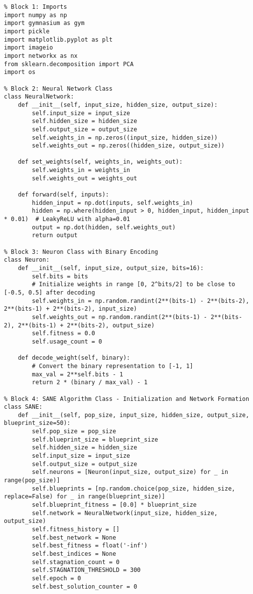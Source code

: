 \documentclass[a4paper,12pt]{article}
\begin{document}
\begin{lstlisting}
% Block 1: Imports
import numpy as np
import gymnasium as gym
import pickle
import matplotlib.pyplot as plt
import imageio
import networkx as nx
from sklearn.decomposition import PCA
import os

% Block 2: Neural Network Class
class NeuralNetwork:
    def __init__(self, input_size, hidden_size, output_size):
        self.input_size = input_size
        self.hidden_size = hidden_size
        self.output_size = output_size
        self.weights_in = np.zeros((input_size, hidden_size))
        self.weights_out = np.zeros((hidden_size, output_size))

    def set_weights(self, weights_in, weights_out):
        self.weights_in = weights_in
        self.weights_out = weights_out

    def forward(self, inputs):
        hidden_input = np.dot(inputs, self.weights_in)
        hidden = np.where(hidden_input > 0, hidden_input, hidden_input * 0.01)  # LeakyReLU with alpha=0.01
        output = np.dot(hidden, self.weights_out)
        return output

% Block 3: Neuron Class with Binary Encoding
class Neuron:
    def __init__(self, input_size, output_size, bits=16):
        self.bits = bits
        # Initialize weights in range [0, 2^bits/2] to be close to [-0.5, 0.5] after decoding
        self.weights_in = np.random.randint(2**(bits-1) - 2**(bits-2), 2**(bits-1) + 2**(bits-2), input_size)
        self.weights_out = np.random.randint(2**(bits-1) - 2**(bits-2), 2**(bits-1) + 2**(bits-2), output_size)
        self.fitness = 0.0
        self.usage_count = 0

    def decode_weight(self, binary):
        # Convert the binary representation to [-1, 1]
        max_val = 2**self.bits - 1
        return 2 * (binary / max_val) - 1

% Block 4: SANE Algorithm Class - Initialization and Network Formation
class SANE:
    def __init__(self, pop_size, input_size, hidden_size, output_size, blueprint_size=50):
        self.pop_size = pop_size
        self.blueprint_size = blueprint_size
        self.hidden_size = hidden_size
        self.input_size = input_size
        self.output_size = output_size
        self.neurons = [Neuron(input_size, output_size) for _ in range(pop_size)]
        self.blueprints = [np.random.choice(pop_size, hidden_size, replace=False) for _ in range(blueprint_size)]
        self.blueprint_fitness = [0.0] * blueprint_size
        self.network = NeuralNetwork(input_size, hidden_size, output_size)
        self.fitness_history = []
        self.best_network = None
        self.best_fitness = float('-inf')
        self.best_indices = None
        self.stagnation_count = 0
        self.STAGNATION_THRESHOLD = 300
        self.epoch = 0
        self.best_solution_counter = 0


\end{lstlisting}
\end{document}
